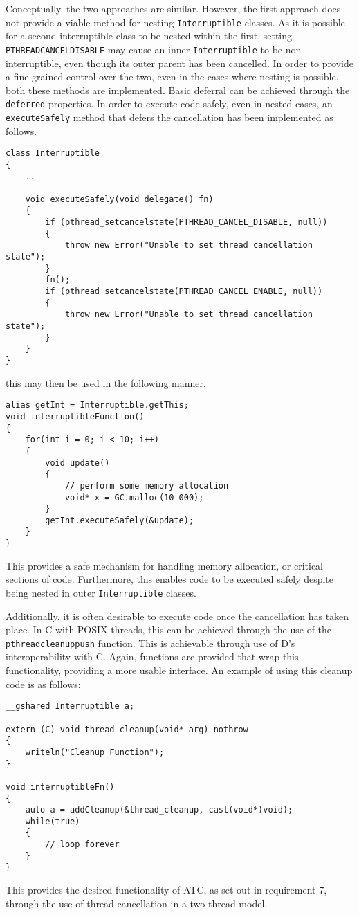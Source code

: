 Conceptually, the two approaches are similar. However, the first approach does 
not provide a viable method for nesting \texttt{Interruptible} classes. As it is 
possible for a second interruptible class to be nested within the first, setting 
\texttt{PTHREAD\textunderscore{}CANCEL\textunderscore{}DISABLE} may cause an 
inner \texttt{Interruptible} to be non-interruptible, even though its outer parent 
has been cancelled. In order to provide a fine-grained control over the two, 
even in the cases where nesting is possible, both these methods are implemented. 
Basic deferral can be achieved through the \texttt{deferred} properties. In order 
to execute code safely, even in nested cases, an \texttt{executeSafely} method that 
defers the cancellation has been implemented as follows. 
\begin{lstlisting}
class Interruptible
{
    ..

    void executeSafely(void delegate() fn)
    {
        if (pthread_setcancelstate(PTHREAD_CANCEL_DISABLE, null))
        {
            throw new Error("Unable to set thread cancellation state");
        }
        fn();
        if (pthread_setcancelstate(PTHREAD_CANCEL_ENABLE, null))
        {
            throw new Error("Unable to set thread cancellation state");
        }
    }
}
\end{lstlisting}
this may then be used in the following manner. 
\begin{lstlisting}
alias getInt = Interruptible.getThis;
void interruptibleFunction() 
{
    for(int i = 0; i < 10; i++)
    {
        void update() 
        {
            // perform some memory allocation
            void* x = GC.malloc(10_000); 
        }
        getInt.executeSafely(&update);
    }
}
\end{lstlisting}
This provides a safe mechanism for handling memory allocation, or critical sections 
of code. Furthermore, this enables code to be executed safely despite being 
nested in outer \texttt{Interruptible} classes. 
\par\bigskip\noindent
Additionally, it is often desirable to execute code once the cancellation has taken 
place. In C with POSIX threads, this can be achieved through the use of the 
\texttt{pthread\textunderscore{}cleanup\textunderscore{}push} function. 
This is achievable through use of D's interoperability with C. Again, functions are provided 
that wrap this functionality, providing a more usable interface. An example of using 
this cleanup code is as follows: 
\begin{lstlisting}
__gshared Interruptible a; 

extern (C) void thread_cleanup(void* arg) nothrow
{
    writeln("Cleanup Function");
}

void interruptibleFn()
{
    auto a = addCleanup(&thread_cleanup, cast(void*)void);
    while(true)
    {
        // loop forever
    }
}
\end{lstlisting}
This provides the desired functionality of ATC, as set out in requirement 7, 
through the use of thread cancellation in a two-thread model.

